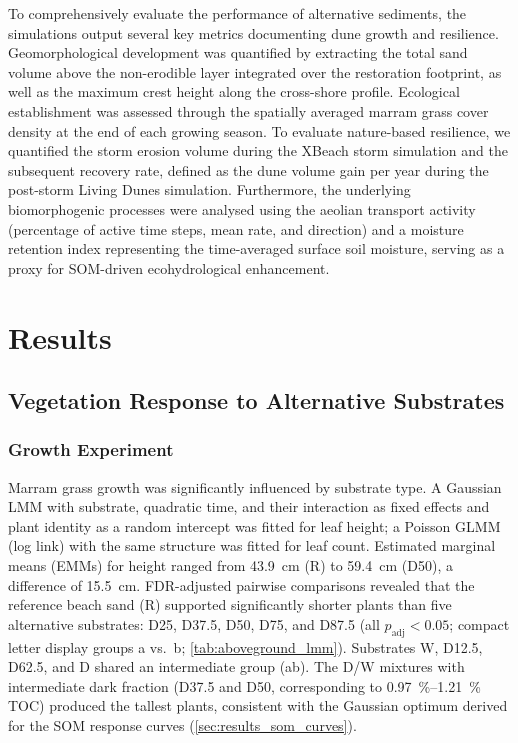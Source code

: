 \documentclass[authoryear,preprint,review,12pt]{elsarticle}
\begin{document}
To comprehensively evaluate the performance of alternative sediments, the simulations output several key metrics documenting dune growth and resilience. Geomorphological development was quantified by extracting the total sand volume above the non-erodible layer integrated over the restoration footprint, as well as the maximum crest height along the cross-shore profile. Ecological establishment was assessed through the spatially averaged marram grass cover density at the end of each growing season. To evaluate nature-based resilience, we quantified the storm erosion volume during the XBeach storm simulation and the subsequent recovery rate, defined as the dune volume gain per year during the post-storm Living Dunes simulation. Furthermore, the underlying biomorphogenic processes were analysed using the aeolian transport activity (percentage of active time steps, mean rate, and direction) and a moisture retention index representing the time-averaged surface soil moisture, serving as a proxy for SOM-driven ecohydrological enhancement.


\section{Results}

\subsection{Vegetation Response to Alternative Substrates}

\subsubsection{Growth Experiment}
\label{sec:results_growth}

Marram grass growth was significantly influenced by substrate type. A Gaussian LMM with substrate, quadratic time, and their interaction as fixed effects and plant identity as a random intercept was fitted for leaf height; a Poisson GLMM (log link) with the same structure was fitted for leaf count. Estimated marginal means (EMMs) for height ranged from \SI{43.9}{\centi\metre} (R) to \SI{59.4}{\centi\metre} (D50), a difference of \SI{15.5}{\centi\metre}. FDR-adjusted pairwise comparisons revealed that the reference beach sand (R) supported significantly shorter plants than five alternative substrates: D25, D37.5, D50, D75, and D87.5 (all $p_{\mathrm{adj}} < 0.05$; compact letter display groups a vs.\ b; \cref{tab:aboveground_lmm}). Substrates W, D12.5, D62.5, and D shared an intermediate group (ab). The D/W mixtures with intermediate dark fraction (D37.5 and D50, corresponding to \SIrange{0.97}{1.21}{\percent} TOC) produced the tallest plants, consistent with the Gaussian optimum derived for the SOM response curves (\cref{sec:results_som_curves}).
\end{document}
